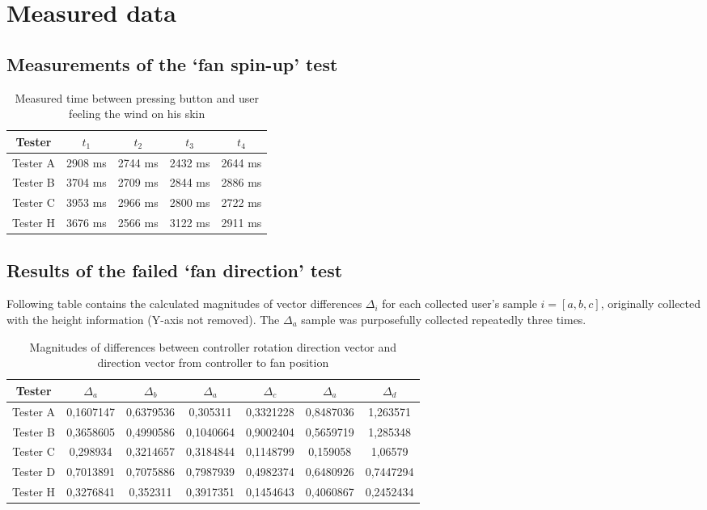 \chapter{Measured data}\label{measured}

\section{Measurements of the `fan spin-up' test}\label{measured:a}

\begin{table}[H]
\centering
\begin{tabular}{|c|c|c|c|c|}
    \hline
    \textbf{Tester} & \textbf{$ t_1 $} & \textbf{$ t_2 $} & \textbf{$ t_3 $} & \textbf{$ t_4 $} \\
    \hline
    Tester A & 2908 ms & 2744 ms & 2432 ms & 2644 ms \\
    Tester B & 3704 ms & 2709 ms & 2844 ms & 2886 ms \\
    Tester C & 3953 ms & 2966 ms & 2800 ms & 2722 ms \\
    Tester H & 3676 ms & 2566 ms & 3122 ms & 2911 ms \\
    \hline
\end{tabular}
\caption{Measured time between pressing button and user feeling the wind on his skin}
\end{table}

\section{Results of the failed `fan direction' test}\label{measured:b}
Following table contains the calculated magnitudes of vector differences $ \Delta_i $
for each collected user’s sample $ i = [a, b, c] $, originally collected with the
height information (Y-axis not removed). The $ \Delta_a $ sample was purposefully
collected repeatedly three times.

\begin{table}[H]
\centering
\begin{tabular}{|c|c|c|c|c|c|c|}
\hline
\textbf{Tester} & \textbf{$ \Delta_a $} & \textbf{$ \Delta_b $} & \textbf{$ \Delta_a $} & \textbf{$ \Delta_c $} & \textbf{$ \Delta_a $} & \textbf{$ \Delta_d $} \\  
\hline
Tester A & 0,1607147 & 0,6379536 & 0,305311 & 0,3321228 & 0,8487036 & 1,263571 \\ 
Tester B & 0,3658605 & 0,4990586 & 0,1040664 & 0,9002404 & 0,5659719 & 1,285348 \\ 
Tester C & 0,298934 & 0,3214657 & 0,3184844 & 0,1148799 & 0,159058 & 1,06579 \\ 
Tester D & 0,7013891 & 0,7075886 & 0,7987939 & 0,4982374 & 0,6480926 & 0,7447294 \\ 
Tester H & 0,3276841 & 0,352311 & 0,3917351 & 0,1454643 & 0,4060867 & 0,2452434 \\ 
\hline
\end{tabular}
\caption{Magnitudes of differences between controller rotation direction vector and direction vector from controller to fan position}
\end{table}

